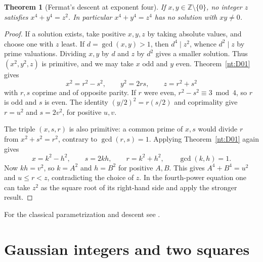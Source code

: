 \documentclass[11pt,oneside,openany]{book}
\theoremstyle{plain}
\newtheorem{theorem}{Theorem}[chapter]
\theoremstyle{definition}
\theoremstyle{remark}
\begin{document}
\begin{theorem}[Fermat's descent at exponent four]\label{nt:D02}
If \(x,y\in\mathbb Z\setminus\{0\}\), no integer \(z\) satisfies
\(x^4+y^4=z^2\). In particular \(x^4+y^4=z^4\) has no solution with
\(xy\ne0\).
\end{theorem}
\begin{proof}
If a solution exists, take positive \(x,y,z\) by taking absolute
values, and choose one with \(z\) least. If \(d=\gcd(x,y)>1\), then
\(d^4\mid z^2\), whence \(d^2\mid z\) by prime valuations. Dividing
\(x,y\) by \(d\) and \(z\) by \(d^2\) gives a smaller solution.
Thus \((x^2,y^2,z)\) is primitive, and we may take \(x\) odd and
\(y\) even. Theorem~\ref{nt:D01} gives
\[
 x^2=r^2-s^2,\qquad y^2=2rs,\qquad z=r^2+s^2
\]
with \(r,s\) coprime and of opposite parity. If \(r\) were even,
\(r^2-s^2\equiv3\bmod4\), so \(r\) is odd and \(s\) is even.
The identity \((y/2)^2=r(s/2)\) and coprimality give
\(r=u^2\) and \(s=2v^2\), for positive \(u,v\).

The triple \((x,s,r)\) is also primitive: a common prime of \(x,s\)
would divide \(r\) from \(x^2+s^2=r^2\), contrary to \(\gcd(r,s)=1\).
Applying Theorem~\ref{nt:D01} again gives
\[
 x=k^2-h^2,\qquad s=2kh,\qquad r=k^2+h^2,\qquad \gcd(k,h)=1.
\]
Now \(kh=v^2\), so \(k=A^2\) and \(h=B^2\) for positive \(A,B\).
This gives \(A^4+B^4=u^2\) and \(u\le r<z\), contradicting the choice
of \(z\). In the fourth-power equation one can take \(z^2\) as the
square root of its right-hand side and apply the stronger result.
\end{proof}
For the classical parametrization and descent see \cite[Sections
5.3--5.4, Theorems 5.5 and 5.10]{nzm}.

\section{Gaussian integers and two squares}
\end{document}
